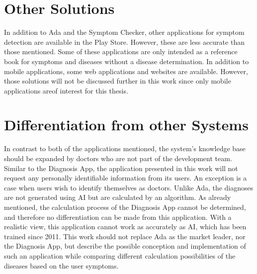 \section{Other Solutions}
In addition to Ada and the Symptom Checker, other applications for symptom detection are available in the Play Store. However, these are less accurate than those mentioned. Some of these applications are only intended as a reference book for symptoms and diseases without a disease determination. In addition to mobile applications, some web applications and websites are available. However, those solutions will not be discussed further in this work since only mobile applications areof interest for this thesis.

\section{Differentiation from other Systems}
In contrast to both of the applications mentioned, the system's knowledge base should be expanded by doctors who are not part of the development team. Similar to the Diagnosis App, the application presented in this work will not request any personally identifiable information from its users. An exception is a case when users wish to identify themselves as doctors. Unlike Ada, the diagnoses are not generated using AI but are calculated by an algorithm. As already mentioned, the calculation process of the Diagnosis App cannot be determined, and therefore no differentiation can be made from this application. With a realistic view, this application cannot work as accurately as AI, which has been trained since 2011. This work should not replace Ada as the market leader, nor the Diagnosis App, but describe the possible conception and implementation of such an application while comparing different calculation possibilities of the diseases based on the user symptoms.





